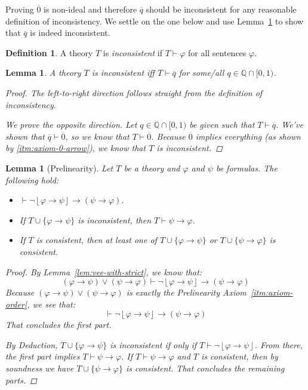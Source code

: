 \documentclass{amsart}
\newtheorem{lemma}[theorem]{Lemma}
\theoremstyle{definition}
\newtheorem{definition}[theorem]{Definition}
\numberwithin{equation}{theorem}
\renewcommand{\phi}{\varphi}
\newcommand{\Q}{\mathbb{Q}}
\newcommand{\proves}{\vdash}
\newcommand{\strict}[1]{{\left\lfloor#1\right\rfloor}}
\newcommand{\rat}[1]{{\overline{#1}}}
\newcommand{\narrow}[1]{\xrightarrow{#1}}
\renewcommand{\to}{\narrow{}}
\begin{document}
Proving $\rat 0$ is non-ideal and therefore $\rat q$ should be inconsistent for any reasonable definition of inconsistency.
We settle on the one below and use Lemma~\ref{lem:alt-def-inconsistency} to show that $\rat q$ is indeed inconsistent.
\begin{definition}
  A theory $T$ is \emph{inconsistent} if $T\proves\phi$ for all sentences $\phi$.
\end{definition}
\begin{lemma}\label{lem:alt-def-inconsistency}
  A theory $T$ is inconsistent iff $T\proves\rat q$ for some/all $q\in\Q\cap[0,1)$.
  \begin{proof}
    The left-to-right direction follows straight from the definition of inconsistency.
    
    We prove the opposite direction.
    Let $q\in\Q\cap[0,1)$ be given such that $T\proves\rat q$.
    We've shown that $\rat q\proves\rat 0$, so we know that $T\proves\rat 0$.
    Because $\rat 0$ implies everything (as shown by \ref{itm:axiom-0-arrow}), we know that $T$ is inconsistent.
  \end{proof}
\end{lemma}

\begin{lemma}[Prelinearity]\label{lem:prelinearity}
  Let $T$ be a theory and $\phi$ and $\psi$ be formulas.
  The following hold:
  \begin{itemize}
  \item $\proves\neg\strict{\phi\to\psi}\to(\psi\to\phi)$.
  \item If $T\cup\{\phi\to\psi\}$ is inconsistent, then $T\proves\psi\to\phi$.
  \item If $T$ is consistent, then at least one of $T\cup\{\phi\to\psi\}$ or $T\cup\{\psi\to\phi\}$ is consistent.
  \end{itemize}
  \begin{proof}
    By Lemma~\ref{lem:vee-with-strict}, we know that:
    \[
      (\phi\to\psi)\vee(\psi\to\phi)\proves\neg\strict{\phi\to\psi}\to(\psi\to\phi)
    \]
    Because $(\phi\to\psi)\vee(\psi\to\phi)$ is exactly the Prelinearity Axiom~\ref{itm:axiom-order}, we see that:
    \[
      \proves\neg\strict{\phi\to\psi}\to(\psi\to\phi)
    \]
    That concludes the first part.
    
    By Deduction, $T\cup\{\phi\to\psi\}$ is inconsistent if only if $T\proves\neg\strict{\phi\to\psi}$.
    From there, the first part implies $T\proves\psi\to\phi$.
    If $T\proves\psi\to\phi$ and $T$ is consistent, then by soundness we have $T\cup\{\psi\to\phi\}$ is consistent.
    That concludes the remaining parts.
  \end{proof}
\end{lemma}
\end{document}
